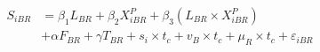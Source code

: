\begin{align}
    S_{iBR} &= \beta_{1} L_{BR} + \beta_{2} X_{iBR}^{P} + \beta_{3} (L_{BR} \times X_{iBR}^{P} ) \nonumber \\
    &+ \alpha F_{BR} + \gamma T_{BR}+ s_{i} \times t_{c}+ v_{B} \times t_{c}+\mu_{R} \times t_{c}+\varepsilon_{iBR}
\end{align}
